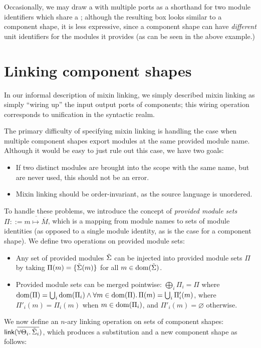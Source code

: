 \noindent
Occasionally, we may draw a \uid{} with multiple ports as a shorthand
for two module identifiers which share a \uid{}; although the resulting
box looks similar to a component shape, it is less expressive, since a
component shape can have \emph{different} unit identifiers for the
modules it provides (as can be seen in the above example.)

\section{Linking component shapes}

In our informal description of mixin linking, we simply described mixin
linking as simply ``wiring up'' the input output ports of components;
this wiring operation corresponds to unification in the syntactic realm.

The primary difficulty of specifying mixin linking is handling the
case when multiple component shapes export modules at the same
provided module name.  Although it would be easy to just rule
out this case, we have two goals:

\begin{itemize}
    \item If two distinct modules are brought into the scope with the same
    name, but are never used, this should not be an error.

    \item Mixin linking should be order-invariant, as the source language
    is unordered.
\end{itemize}
%
To handle these problems, we introduce the concept of
\emph{provided module sets} $\Pi ::= \overline{m \mapsto \overline{M}}$,
which is a mapping from module names to sets of module identities
(as opposed to a single module identity, as is the case for a component shape).
We define two operations on provided module sets:

\begin{itemize}
\item Any set of provided modules ${\tilde{\Sigma}}$ can be injected into provided module sets $\Pi$ by taking $\Pi(m) = \{ {\tilde{\Sigma}}(m) \}$ for all $m \in \operatorname{dom}({\tilde{\Sigma}})$.

\item Provided module sets can be merged pointwise: $\bigoplus_i \Pi_i = \Pi$ where $\operatorname{dom}(\Pi) = \bigcup_i \operatorname{dom}(\Pi_i) \land\forall m \in \operatorname{dom}(\Pi).\, \Pi(m) = \bigcup_i \Pi'_i(m)$, where $\Pi'_i(m) = \Pi_i(m)$ when $m \in \operatorname{dom}(\Pi_i)$, and $\Pi'_i(m) = \varnothing$ otherwise.
\end{itemize}
%
We now define an $n$-ary linking operation on sets of component shapes: $\textsf{link}(\overline{\forall \Theta_i.\, {\tilde{\Sigma}}_i})$, which produces a substitution and a new component shape as follows:

